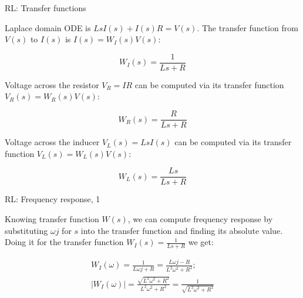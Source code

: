 \documentclass{beamer}
\begin{document}
\begin{frame}{RL: Transfer functions}
	\begin{flushleft}
		
		Laplace domain ODE is $Ls I(s) + I(s)R = V(s)$. The transfer function from $V(s)$ to $I(s)$ is $I(s) = W_I(s)V(s)$:
		
		\begin{equation}
			W_I(s) = \frac{1}{Ls + R}
		\end{equation}
		
		Voltage across the resistor $V_R = IR$ can be computed via its transfer function $V_R(s) = W_R(s) V(s)$:
		
		\begin{equation}
			W_R(s) = \frac{R}{Ls + R}
		\end{equation}
	
		Voltage across the inducer $V_L(s) = Ls I(s)$ can be computed via its transfer function $V_L(s) = W_L(s) V(s)$:
	
		\begin{equation}
			W_L(s) = \frac{Ls}{Ls + R}
		\end{equation}

	\end{flushleft}
\end{frame}



\begin{frame}{RL: Frequency response, 1}
	\begin{flushleft}
		
		Knowing transfer function $W(s)$, we can compute frequency response by substituting $\omega j$ for $s$ into the transfer function and finding its absolute value. Doing it for the transfer function $W_I(s) = \frac{1}{Ls + R}$ we get:
		
		\begin{align}
			W_I(\omega) = \frac{1}{L\omega j + R} =
			 \frac{L\omega j - R}{L^2\omega^2 + R^2}; \\
			|W_I(\omega)| = \frac{\sqrt{L^2\omega^2 + R^2}}{L^2\omega^2 + R^2} =
			\frac{1}{\sqrt{L^2\omega^2 + R^2}}
		\end{align}
		
	\end{flushleft}
\end{frame}
\end{document}
